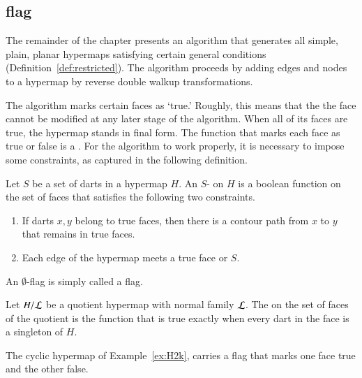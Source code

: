 \subsection{flag}
%

The remainder of the chapter presents an algorithm that generates all
simple, plain, planar hypermaps satisfying certain general conditions
(Definition~\ref{def:restricted}).  The algorithm proceeds by adding
edges and nodes to a hypermap by reverse double walkup
transformations.

The algorithm  marks certain faces as `true.'
Roughly, this  means that the the face cannot be modified
at any later stage of the algorithm.   When all of its faces
are true, the hypermap stands in final form.
The function that marks each face as true or false is a
.  For the algorithm to work properly, it is necessary
to impose some constraints, as captured in the following definition.
%


\begin{definition}[flag] Let $S$ be a set of darts in a hypermap $H$.  An
$S$- on $H$ is a boolean function on the set of faces that satisfies
the following two constraints. 
\begin{enumerate}
\item If darts $x,y$ belong to true faces,
then there is a contour path from $x$ to $y$ that remains
in true faces.
\item Each edge of the hypermap meets a true face or $S$.
\end{enumerate}
An $\emptyset$-flag is simply called a flag.
%
%
\end{definition}

\begin{definition} Let $H/{\cal L}$ be a
quotient hypermap with normal family $\cal L$.  The
 on the set of faces of the
quotient is the function that is true exactly when every dart in the
face is a singleton of $H$.  %
\end{definition}

\begin{example} The cyclic hypermap of Example~\ref{ex:H2k}, carries a
flag that marks one face true and the other false.
\end{example}

